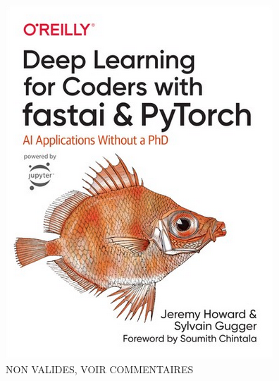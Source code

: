 \documentclass[12pt]{article} 	%
\begin{document}
\begin{figure}[h!]
	\begin{center}
		\includegraphics[scale=1.3]{img/fastbook.png}
	\end{center}
  \caption{NON VALIDES, VOIR COMMENTAIRES\cite{howard2020deep}}  %
  \label{fig:fastbook}
\end{figure}


\newpage

\end{document}
